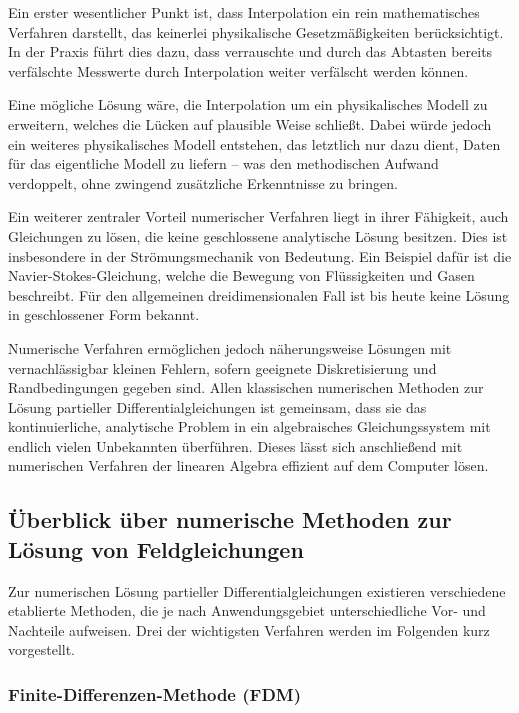 Ein erster wesentlicher Punkt ist, dass Interpolation ein rein mathematisches Verfahren darstellt, das keinerlei physikalische Gesetzmäßigkeiten berücksichtigt.
In der Praxis führt dies dazu, dass verrauschte und durch das Abtasten bereits verfälschte Messwerte durch Interpolation weiter verfälscht werden können.

Eine mögliche Lösung wäre, die Interpolation um ein physikalisches Modell zu erweitern, welches die Lücken auf plausible Weise schließt.
Dabei würde jedoch ein weiteres physikalisches Modell entstehen, das letztlich nur dazu dient, Daten für das eigentliche Modell zu liefern – was den methodischen Aufwand verdoppelt, ohne zwingend zusätzliche Erkenntnisse zu bringen.

Ein weiterer zentraler Vorteil numerischer Verfahren liegt in ihrer Fähigkeit, auch Gleichungen zu lösen, die keine geschlossene analytische Lösung besitzen.
Dies ist insbesondere in der Strömungsmechanik von Bedeutung.
Ein Beispiel dafür ist die Navier-Stokes-Gleichung, welche die Bewegung von Flüssigkeiten und Gasen beschreibt.
Für den allgemeinen dreidimensionalen Fall ist bis heute keine Lösung in geschlossener Form bekannt.

Numerische Verfahren ermöglichen jedoch näherungsweise Lösungen mit vernachlässigbar kleinen Fehlern, sofern geeignete Diskretisierung und Randbedingungen gegeben sind.
Allen klassischen numerischen Methoden zur Lösung partieller Differentialgleichungen ist gemeinsam, dass sie das kontinuierliche, analytische Problem in ein algebraisches Gleichungssystem mit endlich vielen Unbekannten überführen.
Dieses lässt sich anschließend mit numerischen Verfahren der linearen Algebra effizient auf dem Computer lösen.

\subsection{Überblick über numerische Methoden zur Lösung von Feldgleichungen}

Zur numerischen Lösung partieller Differentialgleichungen existieren verschiedene etablierte Methoden, die je nach Anwendungsgebiet unterschiedliche Vor- und Nachteile aufweisen.
Drei der wichtigsten Verfahren werden im Folgenden kurz vorgestellt.

\subsubsection{Finite-Differenzen-Methode (FDM)}
\label{parallelisierung:section:fdm}

